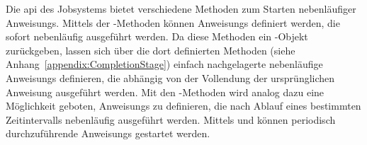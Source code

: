 Die \acs{api} des Jobsystems bietet verschiedene Methoden zum Starten nebenläufiger \glspl{Anweisung}. Mittels der -Methoden können \glspl{Anweisung} definiert werden, die sofort nebenläufig ausgeführt werden. Da diese Methoden ein \classCompletableFuture{}-Objekt zurückgeben, lassen sich über die dort definierten Methoden (siehe Anhang~\vref{appendix:CompletionStage}) einfach nachgelagerte nebenläufige \glspl{Anweisung} definieren, die abhängig von der Vollendung der ursprünglichen \gls{Anweisung} ausgeführt werden. Mit den -Methoden wird analog dazu eine Möglichkeit geboten, \glspl{Anweisung} zu definieren, die nach Ablauf eines bestimmten Zeitintervalls nebenläufig ausgeführt werden. Mittels  und  können periodisch durchzuführende \glspl{Anweisung} gestartet werden.